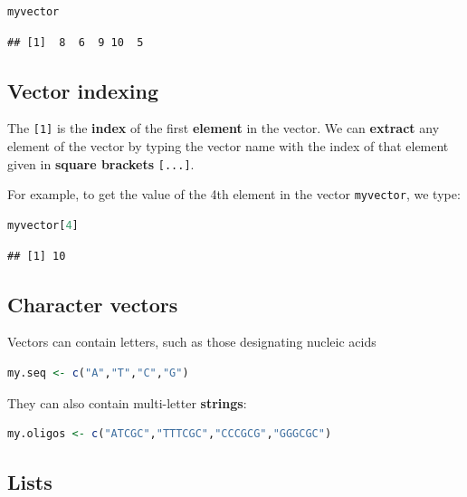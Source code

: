 \documentclass[
]{book}
\newcommand{\passthrough}[1]{#1}
\begin{document}
\begin{lstlisting}[language=R]
myvector
\end{lstlisting}

\begin{lstlisting}
## [1]  8  6  9 10  5
\end{lstlisting}

\hypertarget{vector-indexing}{%
\subsection{Vector indexing}\label{vector-indexing}}

The \passthrough{\lstinline![1]!} is the \textbf{index} of the first \textbf{element} in the vector. We can \textbf{extract} any element of the vector by typing the vector name with the index of that element given in \textbf{square brackets} \passthrough{\lstinline![...]!}.

For example, to get the value of the 4th element in the vector \passthrough{\lstinline!myvector!}, we type:

\begin{lstlisting}[language=R]
myvector[4]
\end{lstlisting}

\begin{lstlisting}
## [1] 10
\end{lstlisting}

\hypertarget{character-vectors}{%
\subsection{Character vectors}\label{character-vectors}}

Vectors can contain letters, such as those designating nucleic acids

\begin{lstlisting}[language=R]
my.seq <- c("A","T","C","G")
\end{lstlisting}

They can also contain multi-letter \textbf{strings}:

\begin{lstlisting}[language=R]
my.oligos <- c("ATCGC","TTTCGC","CCCGCG","GGGCGC")
\end{lstlisting}

\hypertarget{lists}{%
\subsection{Lists}\label{lists}}
\end{document}
